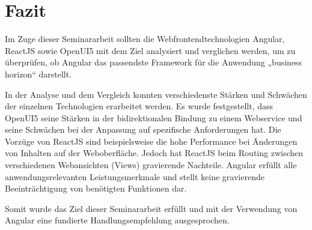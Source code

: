 

\chapter{Fazit}

Im Zuge dieser Seminararbeit sollten die Webfrontendtechnologien Angular, ReactJS sowie OpenUI5 mit dem Ziel analysiert und verglichen werden, um zu überprüfen, ob Angular das passendste Framework für die Anwendung „business horizon“ darstellt. 

In der Analyse und dem Vergleich konnten verschiedenste Stärken und Schwächen der einzelnen Technologien erarbeitet werden. Es wurde festgestellt, dass OpenUI5 seine Stärken in der bidirektionalen Bindung zu einem Webservice und seine Schwächen bei der Anpassung auf spezifische Anforderungen hat. Die Vorzüge von ReactJS sind beispielsweise die hohe Performance bei Änderungen von Inhalten auf der Weboberfläche. Jedoch hat ReactJS beim Routing zwischen verschiedenen Webansichten (Views) gravierende Nachteile. Angular erfüllt alle anwendungsrelevanten Leistungsmerkmale und stellt keine gravierende Beeinträchtigung von benötigten Funktionen dar. 

Somit wurde das Ziel dieser Seminararbeit erfüllt und mit der Verwendung von Angular eine fundierte Handlungsempfehlung ausgesprochen.
